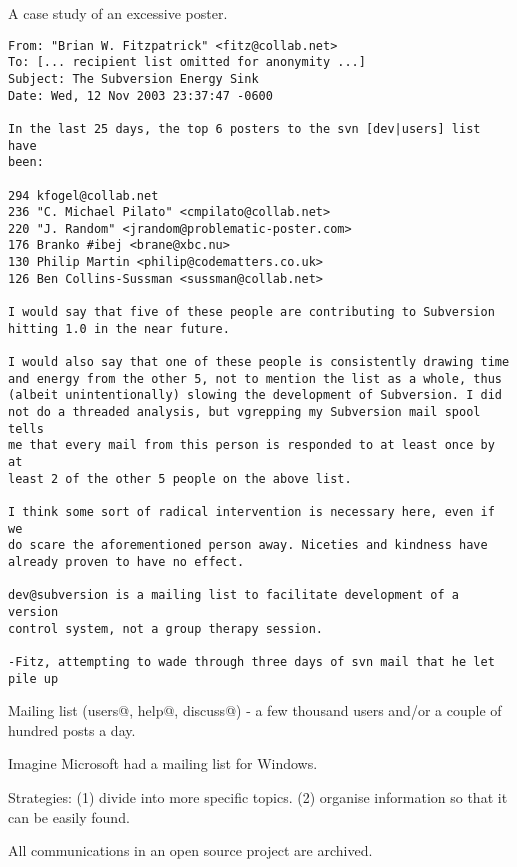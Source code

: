 \documentclass[landscape,30pt]{foils}
\begin{document}
\newpage
A case study of an excessive poster.

{\tiny
\begin{verbatim}
From: "Brian W. Fitzpatrick" <fitz@collab.net>
To: [... recipient list omitted for anonymity ...]
Subject: The Subversion Energy Sink
Date: Wed, 12 Nov 2003 23:37:47 -0600

In the last 25 days, the top 6 posters to the svn [dev|users] list have
been:

294 kfogel@collab.net
236 "C. Michael Pilato" <cmpilato@collab.net>
220 "J. Random" <jrandom@problematic-poster.com>
176 Branko #ibej <brane@xbc.nu>
130 Philip Martin <philip@codematters.co.uk>
126 Ben Collins-Sussman <sussman@collab.net>

I would say that five of these people are contributing to Subversion
hitting 1.0 in the near future.

I would also say that one of these people is consistently drawing time
and energy from the other 5, not to mention the list as a whole, thus
(albeit unintentionally) slowing the development of Subversion. I did
not do a threaded analysis, but vgrepping my Subversion mail spool tells
me that every mail from this person is responded to at least once by at
least 2 of the other 5 people on the above list.

I think some sort of radical intervention is necessary here, even if we
do scare the aforementioned person away. Niceties and kindness have
already proven to have no effect.

dev@subversion is a mailing list to facilitate development of a version
control system, not a group therapy session.

-Fitz, attempting to wade through three days of svn mail that he let
pile up
\end{verbatim}
}


Mailing list (users@, help@, discuss@) - a few thousand users and/or a couple of hundred posts a day.

Imagine Microsoft had a mailing list for Windows.

Strategies: (1) divide into more specific topics. (2) organise information so that it can be easily found.



All communications in an open source project are archived.
\end{document}
